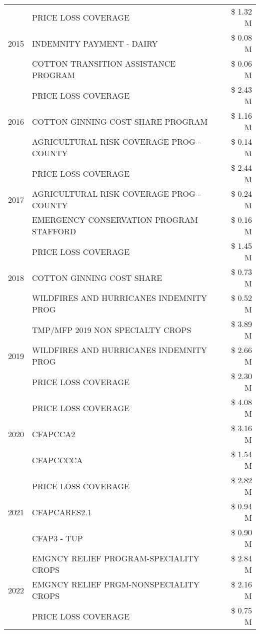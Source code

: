 \begin{tabular}{llr}
\cline{1-3}
\multirow[t]{3}{*}{2015} & PRICE LOSS COVERAGE & \$ 1.32 M \\
 & INDEMNITY PAYMENT - DAIRY & \$ 0.08 M \\
 & COTTON TRANSITION ASSISTANCE PROGRAM & \$ 0.06 M \\
\cline{1-3}
\multirow[t]{3}{*}{2016} & PRICE LOSS COVERAGE & \$ 2.43 M \\
 & COTTON GINNING COST SHARE PROGRAM & \$ 1.16 M \\
 & AGRICULTURAL RISK COVERAGE PROG - COUNTY & \$ 0.14 M \\
\cline{1-3}
\multirow[t]{3}{*}{2017} & PRICE LOSS COVERAGE & \$ 2.44 M \\
 & AGRICULTURAL RISK COVERAGE PROG - COUNTY & \$ 0.24 M \\
 & EMERGENCY CONSERVATION PROGRAM STAFFORD & \$ 0.16 M \\
\cline{1-3}
\multirow[t]{3}{*}{2018} & PRICE LOSS COVERAGE & \$ 1.45 M \\
 & COTTON GINNING COST SHARE & \$ 0.73 M \\
 & WILDFIRES AND HURRICANES INDEMNITY PROG & \$ 0.52 M \\
\cline{1-3}
\multirow[t]{3}{*}{2019} & TMP/MFP 2019 NON SPECIALTY CROPS & \$ 3.89 M \\
 & WILDFIRES AND HURRICANES INDEMNITY PROG & \$ 2.66 M \\
 & PRICE LOSS COVERAGE & \$ 2.30 M \\
\cline{1-3}
\multirow[t]{3}{*}{2020} & PRICE LOSS COVERAGE & \$ 4.08 M \\
 & CFAPCCA2 & \$ 3.16 M \\
 & CFAPCCCCA & \$ 1.54 M \\
\cline{1-3}
\multirow[t]{3}{*}{2021} & PRICE LOSS COVERAGE & \$ 2.82 M \\
 & CFAPCARES2.1 & \$ 0.94 M \\
 & CFAP3 - TUP & \$ 0.90 M \\
\cline{1-3}
\multirow[t]{3}{*}{2022} & EMGNCY RELIEF PROGRAM-SPECIALITY CROPS & \$ 2.84 M \\
 & EMGNCY RELIEF PRGM-NONSPECIALITY CROPS & \$ 2.16 M \\
 & PRICE LOSS COVERAGE & \$ 0.75 M \\
\cline{1-3}
\bottomrule
\end{tabular}
